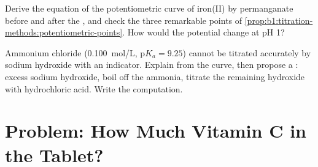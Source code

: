 \begin{exercise}[$\star\star\star$]\label{exo:b1:titration-methods:11}
Derive the equation of the potentiometric curve of iron(II) by
permanganate before and after the , and check the three
remarkable points of \cref{prop:b1:titration-methods:potentiometric-points}.
How would the  potential change at pH 1?
\end{exercise}

\begin{exercise}[$\star\star\star$]\label{exo:b1:titration-methods:12}
Ammonium chloride (\qty{0.100}{mol/L}, $\mathrm{p}K_a = 9.25$) cannot be
titrated accurately by sodium hydroxide with an indicator. Explain from
the curve, then propose a : excess sodium hydroxide, boil
off the ammonia, titrate the remaining hydroxide with hydrochloric acid.
Write the computation.
\end{exercise}

\section{Problem: How Much Vitamin C in the Tablet?}

